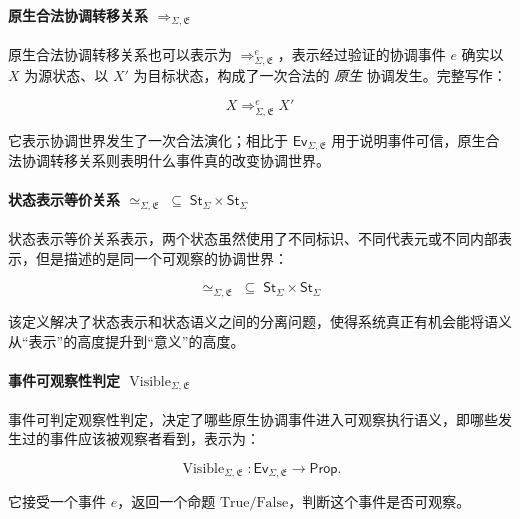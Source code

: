 \paragraph{原生合法协调转移关系 $\Rightarrow_{\Sigma,\mathfrak E}$} 原生合法协调转移关系也可以表示为 $\Rightarrow^{e}_{\Sigma,\mathfrak E}$，表示经过验证的协调事件 $e$ 确实以 $X$ 为源状态、以 $X'$ 为目标状态，构成了一次合法的 \textit{原生} 协调发生。完整写作：

\begin{equation}
  \boxed{
    X
    \mathrel{\Rightarrow_{\Sigma,\mathfrak E}^{e}}
    X'
  }\label{eq:native-legal-coordination-transition}
\end{equation}

它表示协调世界发生了一次合法演化；相比于 $\mathsf{Ev}_{\Sigma,\mathfrak E}$ 用于说明事件可信，原生合法协调转移关系则表明什么事件真的改变协调世界。

\paragraph{状态表示等价关系 $\simeq_{\Sigma,\mathfrak E}
\;\subseteq\; \mathsf{St}_{\Sigma}\times\mathsf{St}_{\Sigma}$} 状态表示等价关系表示，两个状态虽然使用了不同标识、不同代表元或不同内部表示，但是描述的是同一个可观察的协调世界：

\begin{equation}
  \boxed{
    \simeq_{\Sigma,\mathfrak E}
    \;\subseteq\;
    \mathsf{St}_{\Sigma}\times\mathsf{St}_{\Sigma}
  }\label{eq:state-representation-equivalence-relation}
\end{equation}

该定义解决了状态表示和状态语义之间的分离问题，使得系统真正有机会能将语义从“表示”的高度提升到“意义”的高度。

\paragraph{事件可观察性判定 $\operatorname{Visible}_{\Sigma,\mathfrak E}$} 事件可判定观察性判定，决定了哪些原生协调事件进入可观察执行语义，即哪些发生过的事件应该被观察者看到，表示为：

\begin{equation}
  \boxed{
    \operatorname{Visible}_{\Sigma,\mathfrak E}:
    \mathsf{Ev}_{\Sigma,\mathfrak E}\longrightarrow\mathsf{Prop}.
  }\label{eq:event-visibility-predicate}
\end{equation}

它接受一个事件 $e$，返回一个命题 $\text{True/False}$，判断这个事件是否可观察。

